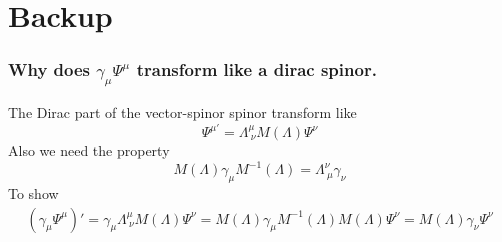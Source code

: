 \section{Backup}
\begin{frame}
	\frametitle{Why does $\gamma_\mu\Psi^\mu$ transform like a dirac spinor.}
	The Dirac part of the vector-spinor spinor transform like
	\begin{equation*}
		\Psi^{\mu'} = \Lambda^\mu_{\ \nu}M(\Lambda) \Psi^\nu
	\end{equation*}
	Also we need the property
	\begin{equation*}
		M(\Lambda)\gamma_\mu M^{-1}(\Lambda) = \Lambda^{\nu}_{\ \mu} \gamma_{\nu}
	\end{equation*}
	To show 
	\begin{align*}
		(\gamma_\mu\Psi^\mu)' = \gamma_\mu  \Lambda^\mu_{\ \nu}M(\Lambda) \Psi^\nu
		= M(\Lambda)\gamma_\mu M^{-1}(\Lambda)M(\Lambda) \Psi^\nu
		= M(\Lambda) \gamma_\nu\Psi^\nu
	\end{align*}
\end{frame}
